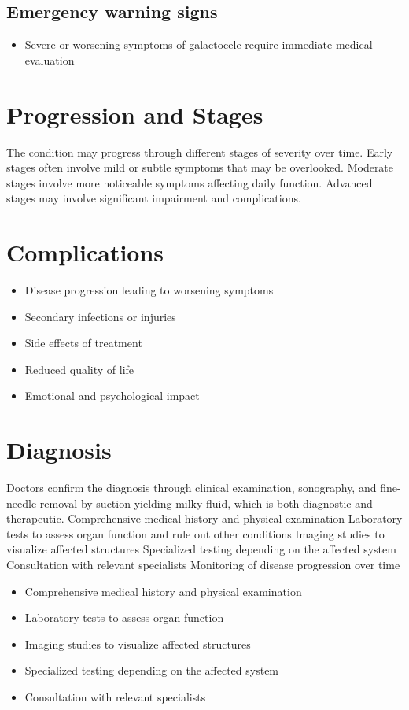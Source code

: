 \subsection{Emergency warning signs}
\begin{itemize}[noitemsep]
  \item Severe or worsening symptoms of galactocele require immediate medical evaluation
\end{itemize}
\section{Progression and Stages}
The condition may progress through different stages of severity over time. Early stages often involve mild or subtle symptoms that may be overlooked. Moderate stages involve more noticeable symptoms affecting daily function. Advanced stages may involve significant impairment and complications.
\section{Complications}
\begin{itemize}[noitemsep]
  \item Disease progression leading to worsening symptoms
  \item Secondary infections or injuries
  \item Side effects of treatment
  \item Reduced quality of life
  \item Emotional and psychological impact
\end{itemize}
\section{Diagnosis}
Doctors confirm the diagnosis through clinical examination, sonography, and fine-needle removal by suction yielding milky fluid, which is both diagnostic and therapeutic. Comprehensive medical history and physical examination Laboratory tests to assess organ function and rule out other conditions Imaging studies to visualize affected structures Specialized testing depending on the affected system Consultation with relevant specialists Monitoring of disease progression over time

\begin{itemize}[noitemsep]
  \item Comprehensive medical history and physical examination
  \item Laboratory tests to assess organ function
  \item Imaging studies to visualize affected structures
  \item Specialized testing depending on the affected system
  \item Consultation with relevant specialists
\end{itemize}

